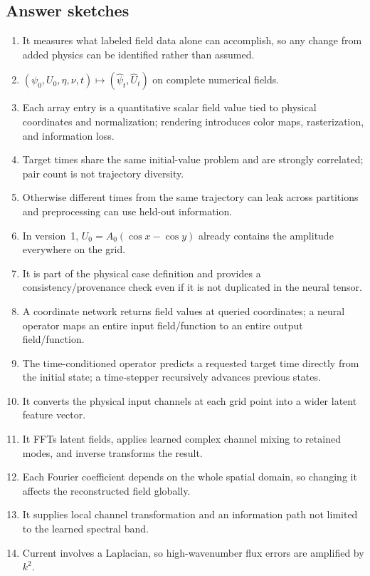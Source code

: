 \documentclass[11pt]{article}
\begin{document}
\subsection*{Answer sketches}
\begin{enumerate}[label=\textbf{A\arabic*.}]
  \item It measures what labeled field data alone can accomplish, so any change from added physics can be identified rather than assumed.
  \item $(\psi_0,U_0,\eta,\nu,t)\mapsto(\widehat\psi_t,\widehat U_t)$ on complete numerical fields.
  \item Each array entry is a quantitative scalar field value tied to physical coordinates and normalization; rendering introduces color maps, rasterization, and information loss.
  \item Target times share the same initial-value problem and are strongly correlated; pair count is not trajectory diversity.
  \item Otherwise different times from the same trajectory can leak across partitions and preprocessing can use held-out information.
  \item In version~1, $U_0=A_0(\cos x-\cos y)$ already contains the amplitude everywhere on the grid.
  \item It is part of the physical case definition and provides a consistency/provenance check even if it is not duplicated in the neural tensor.
  \item A coordinate network returns field values at queried coordinates; a neural operator maps an entire input field/function to an entire output field/function.
  \item The time-conditioned operator predicts a requested target time directly from the initial state; a time-stepper recursively advances previous states.
  \item It converts the physical input channels at each grid point into a wider latent feature vector.
  \item It FFTs latent fields, applies learned complex channel mixing to retained modes, and inverse transforms the result.
  \item Each Fourier coefficient depends on the whole spatial domain, so changing it affects the reconstructed field globally.
  \item It supplies local channel transformation and an information path not limited to the learned spectral band.
  \item Current involves a Laplacian, so high-wavenumber flux errors are amplified by $k^2$.

\end{enumerate}
\end{document}
